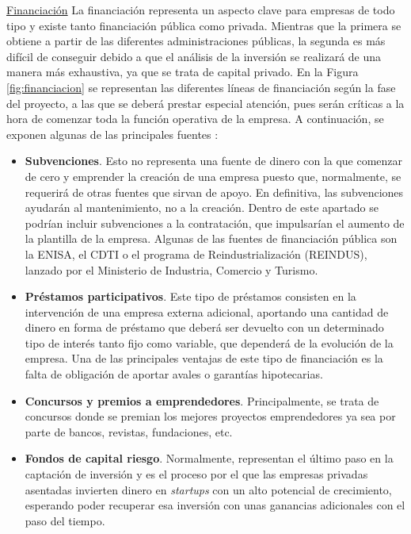 \noindent\underline{Financiación}\newline
\indent La financiación representa un aspecto clave para empresas de todo tipo y existe tanto financiación pública como privada. Mientras que la primera se obtiene a partir de las diferentes administraciones públicas, la segunda es más difícil de conseguir debido a que el análisis de la inversión se realizará de una manera más exhaustiva, ya que se trata de capital privado. En la Figura \ref{fig:financiacion} se representan las diferentes líneas de financiación según la fase del proyecto, a las que se deberá prestar especial atención, pues serán críticas a la hora de comenzar toda la función operativa de la empresa. A continuación, se exponen algunas de las principales fuentes \cite{javierdonoso2018}:

\begin{itemize}
    \item \textbf{Subvenciones}. Esto no representa una fuente de dinero con la que comenzar de cero y emprender la creación de una empresa puesto que, normalmente, se requerirá de otras fuentes que sirvan de apoyo. En definitiva, las subvenciones ayudarán al mantenimiento, no a la creación. Dentro de este apartado se podrían incluir subvenciones a la contratación, que impulsarían el aumento de la plantilla de la empresa. Algunas de las fuentes de financiación pública son la \acf{ENISA}, el \acf{CDTI} o el programa de Reindustrialización (REINDUS), lanzado por el Ministerio de Industria, Comercio y Turismo.
    
    \item \textbf{Préstamos participativos}. Este tipo de préstamos consisten en la intervención de una empresa externa adicional, aportando una cantidad de dinero en forma de préstamo que deberá ser devuelto con un determinado tipo de interés tanto fijo como variable, que dependerá de la evolución de la empresa. Una de las principales ventajas de este tipo de financiación es la falta de obligación de aportar avales o garantías hipotecarias.
    
    \item \textbf{Concursos y premios a emprendedores}. Principalmente, se trata de concursos donde se premian los mejores proyectos emprendedores ya sea por parte de bancos, revistas, fundaciones, etc.
    
    \clearpage
    
    \item \textbf{Fondos de capital riesgo}. Normalmente, representan el último paso en la captación de inversión y es el proceso por el que las empresas privadas asentadas invierten dinero en \textit{startups} con un alto potencial de crecimiento, esperando poder recuperar esa inversión con unas ganancias adicionales con el paso del tiempo.
    

\end{itemize}
